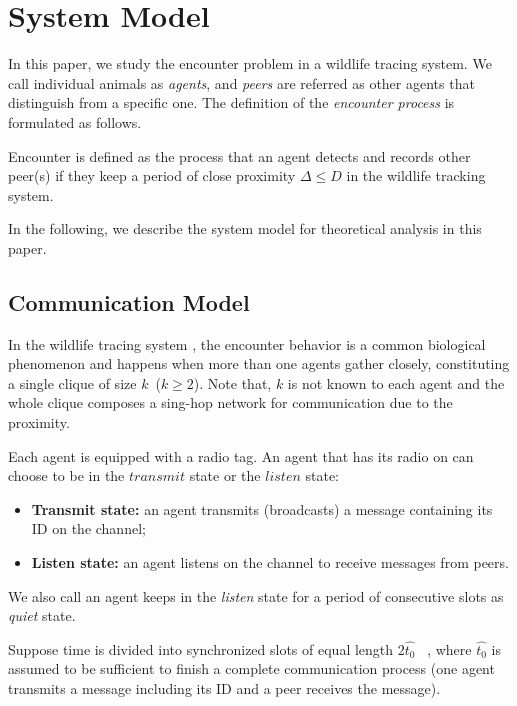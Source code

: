 \section{System Model}
\label{sectionmodel}

In this paper, we study the encounter problem in a wildlife 
tracing system. We call individual animals as \emph{agents}, 
and \emph{peers} are referred as other agents that distinguish from 
a specific one.
The definition of the \emph{encounter process} is formulated as follows.
\begin{definition}
Encounter is defined as the process that 
an agent detects and records other peer(s) if they keep a period of 
close proximity $\Delta \leq D$
in the wildlife tracking system. 
\end{definition}

In the following, we describe the system model for theoretical analysis in this paper.



\subsection{Communication Model}


In the  wildlife tracing system {\sysname}, the encounter behavior  
is a common biological phenomenon and
happens when more than one agents gather closely, constituting a 
single clique of size $k$~($k \geq 2$).
Note that, $k$ is not known to each agent and the whole 
clique composes a sing-hop network for communication due to the proximity. 

Each agent is equipped with a radio tag. 
An agent that has its radio on can choose to be in the $transmit$ state
or the $listen$ state:
\begin{itemize}
\item \textbf{Transmit state:} an agent transmits (broadcasts) 
a message containing its ID on the channel;
\item  \textbf{Listen state:} an agent listens on 
the channel to receive messages from peers.
\end{itemize}
We also call an agent keeps in the \emph{listen} state for a period of consecutive slots 
as \emph{quiet} state.

Suppose time is divided into synchronized slots of equal 
length $2\hat{t_0}$~\cite{Xu2005Lightweight, Sivrikaya2004Time}
, where $\hat{t_0}$ is assumed to be sufficient to finish a complete
communication process (one agent transmits a message including its ID and
a peer receives the message).

